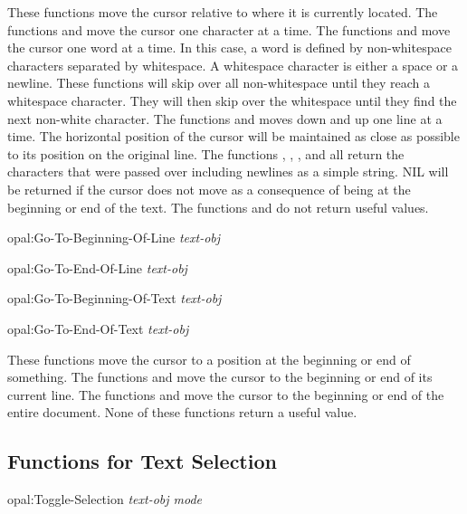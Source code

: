 These functions move the cursor relative to where it is currently located.
The functions  and  move the cursor one
character at a time.  The functions  and 
move the cursor one word at a time.  In this case, a word is defined by
non-whitespace characters separated by whitespace.  A whitespace character is
either a space or a newline.  These functions will skip over all
non-whitespace until they reach a whitespace character.  They will then skip
over the whitespace until they find the next non-white character.  The
functions  and  moves down and up one
line at a time.  The horizontal position of the cursor will be maintained as
close as possible to its position on the original line.  The functions
, , , and
 all return the characters that were passed over including
newlines as a simple string.  {\sc NIL} will be returned if the cursor
does not move as a
consequence of being at the beginning or end of the text.  The
functions  and  do not return
useful values.

\begin{programexample}
opal:Go-To-Beginning-Of-Line {\it text-obj}\value{function}

opal:Go-To-End-Of-Line {\it text-obj}\value{function}

opal:Go-To-Beginning-Of-Text {\it text-obj}\value{function}

opal:Go-To-End-Of-Text {\it text-obj}\value{function}
\end{programexample}

These functions move the cursor to a position at the beginning or end of
something.  The functions  and
 move the cursor to the beginning or end of its current
line.  The functions  and 
move the cursor to the beginning or end of the entire document.  None of these
functions return a useful value.


\subsection{Functions for Text Selection}

\begin{programexample}
opal:Toggle-Selection {\it text-obj mode}\value{function}
\end{programexample}

